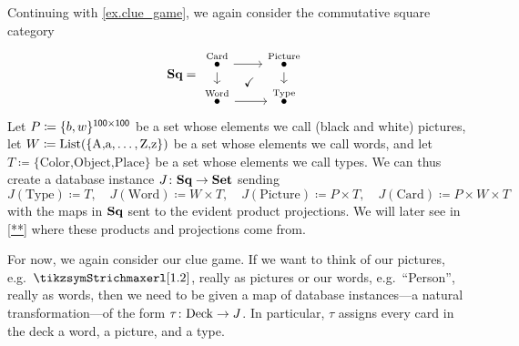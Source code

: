 \documentclass[DynamicalBook]{subfiles}
\begin{document}
\begin{example}
Continuing with \cref{ex.clue_game}, we again consider the commutative square category 
\[
\Cat{Sq}=
\begin{tikzcd}[sep=small, ampersand replacement=\&]
	\LTO{Card}\ar[r]\ar[d]\&[10pt]
	\LTO{Picture}\ar[d]\\
	\LTO{Word}\ar[r]\&
	\LTO{Type}
	\ar[ul, phantom, "\checkmark"]
\end{tikzcd}
\]
Let $P\coloneqq\{b,w\}^{\mathsf{100}\times\mathsf{100}}$ be a set whose elements we call (black and white) pictures, let $W\coloneqq\mathrm{List}(\{\text{A,a},\ldots,\text{Z,z}\})$ be a set whose elements we call words, and let $T\coloneqq\{\text{Color,Object,Place}\}$ be a set whose elements we call types. We can thus create a database instance $J\colon\textbf{Sq}\to\textbf{Set}$ sending
\[
  J(\text{Type})\coloneq T,\quad
  J(\text{Word})\coloneqq W\times T,\quad
  J(\text{Picture})\coloneqq P\times T,\quad
  J(\text{Card})\coloneqq P\times W\times T
\]
with the maps in $\textbf{Sq}$ sent to the evident product projections. We will later see in \cref{**} where these products and projections come from.

For now, we again consider our clue game. If we want to think of our pictures, e.g.\ $\tikzsymStrichmaxerl[1.2]$, really as pictures or our words, e.g.\ ``Person'', really as words, then we need to be given a map of database instances---a natural transformation---of the form $\tau\colon\mathrm{Deck}\to J$. In particular, $\tau$ assigns every card in the deck a word, a picture, and a type.
\end{example}
\end{document}
